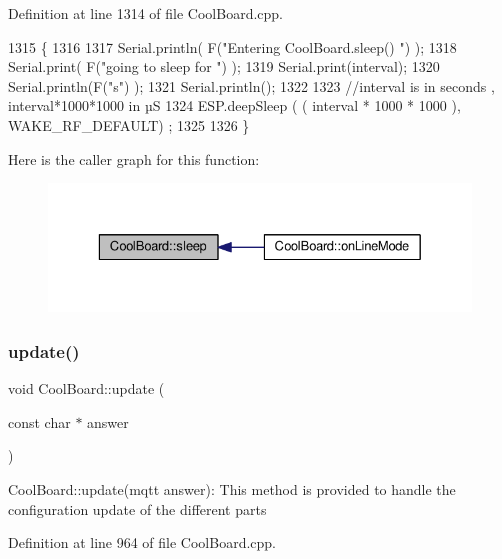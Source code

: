 Definition at line 1314 of file Cool\+Board.\+cpp.


\begin{DoxyCode}
1315 \{
1316 
1317     Serial.println( F(\textcolor{stringliteral}{"Entering CoolBoard.sleep() "}) );
1318     Serial.print( F(\textcolor{stringliteral}{"going to sleep for "}) );
1319     Serial.print(interval);
1320     Serial.println(F(\textcolor{stringliteral}{"s"}) );
1321     Serial.println();
1322     
1323     \textcolor{comment}{//interval is in seconds , interval*1000*1000 in µS}
1324     ESP.deepSleep ( ( interval * 1000 * 1000 ), WAKE\_RF\_DEFAULT) ;
1325 
1326 \}
\end{DoxyCode}
Here is the caller graph for this function\+:\nopagebreak
\begin{figure}[H]
\begin{center}
\leavevmode
\includegraphics[width=329pt]{d7/df9/class_cool_board_a069952cdcb2e7f68518aa429eceadb6e_icgraph}
\end{center}
\end{figure}
\mbox{\label{class_cool_board_a8612756d3f73198cdde857a66f0fe690}} 
\subsubsection{\texorpdfstring{update()}{update()}}
{\footnotesize\ttfamily void Cool\+Board\+::update (\begin{DoxyParamCaption}\item[{const char $\ast$}]{answer }\end{DoxyParamCaption})}

Cool\+Board\+::update(mqtt answer)\+: This method is provided to handle the configuration update of the different parts 

Definition at line 964 of file Cool\+Board.\+cpp.


